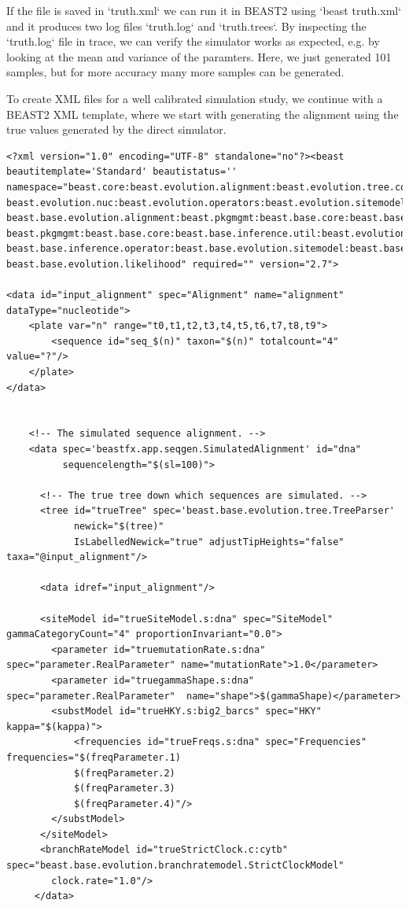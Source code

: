 \documentclass[oneside]{article}
\begin{document}
If the file is saved in `truth.xml` we can run it in BEAST2 using `beast truth.xml` and it produces two log files `truth.log` and `truth.trees`.
By inspecting the `truth.log` file in trace, we can verify the simulator works as expected, e.g. by looking at the mean and variance of the paramters.
Here, we just generated 101 samples, but for more accuracy many more samples can be generated.

To create XML files for a well calibrated simulation study, we continue with a BEAST2 XML template, where we start with generating the alignment using the true values generated by the direct simulator.

{\scriptsize
\begin{lstlisting}
<?xml version="1.0" encoding="UTF-8" standalone="no"?><beast beautitemplate='Standard' beautistatus='' 
namespace="beast.core:beast.evolution.alignment:beast.evolution.tree.coalescent:beast.core.util:
beast.evolution.nuc:beast.evolution.operators:beast.evolution.sitemodel:beast.evolution.substitutionmodel:
beast.base.evolution.alignment:beast.pkgmgmt:beast.base.core:beast.base.inference:beast.base.evolution.tree.coalescent:
beast.pkgmgmt:beast.base.core:beast.base.inference.util:beast.evolution.nuc:beast.base.evolution.operator:
beast.base.inference.operator:beast.base.evolution.sitemodel:beast.base.evolution.substitutionmodel:
beast.base.evolution.likelihood" required="" version="2.7">

<data id="input_alignment" spec="Alignment" name="alignment"  dataType="nucleotide">
    <plate var="n" range="t0,t1,t2,t3,t4,t5,t6,t7,t8,t9">
        <sequence id="seq_$(n)" taxon="$(n)" totalcount="4" value="?"/>
    </plate>
</data>


    <!-- The simulated sequence alignment. -->
    <data spec='beastfx.app.seqgen.SimulatedAlignment' id="dna"
          sequencelength="$(sl=100)">

      <!-- The true tree down which sequences are simulated. -->
      <tree id="trueTree" spec='beast.base.evolution.tree.TreeParser'
            newick="$(tree)"
            IsLabelledNewick="true" adjustTipHeights="false" taxa="@input_alignment"/>

      <data idref="input_alignment"/>

      <siteModel id="trueSiteModel.s:dna" spec="SiteModel" gammaCategoryCount="4" proportionInvariant="0.0">
        <parameter id="truemutationRate.s:dna" spec="parameter.RealParameter" name="mutationRate">1.0</parameter>
        <parameter id="truegammaShape.s:dna" spec="parameter.RealParameter"  name="shape">$(gammaShape)</parameter>
        <substModel id="trueHKY.s:big2_barcs" spec="HKY" kappa="$(kappa)">
            <frequencies id="trueFreqs.s:dna" spec="Frequencies" frequencies="$(freqParameter.1) 
            $(freqParameter.2) 
            $(freqParameter.3) 
            $(freqParameter.4)"/>
        </substModel>
      </siteModel>      
	  <branchRateModel id="trueStrictClock.c:cytb" spec="beast.base.evolution.branchratemodel.StrictClockModel" 
	  	clock.rate="1.0"/>
     </data>
 

\end{lstlisting}}
\end{document}
